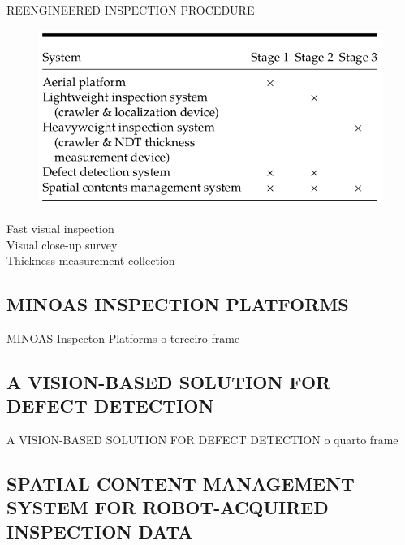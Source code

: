 \documentclass{beamer}
\begin{document}
            \begin{frame}{REENGINEERED INSPECTION PROCEDURE}
                \begin{figure}[htb]
                    \centering
                    \includegraphics[scale=0.35]{figuras/inspection_stages}                   
                    \label{}
                \end{figure}
                Fast visual inspection \\
                Visual close-up survey \\
                Thickness measurement collection
            \end{frame}

        \subsection{MINOAS INSPECTION PLATFORMS}

            \begin{frame}{MINOAS Inspecton Platforms}
                o terceiro frame            
            \end{frame}

        \subsection{A VISION-BASED SOLUTION FOR DEFECT DETECTION}

            \begin{frame}{A VISION-BASED SOLUTION FOR DEFECT DETECTION}
                o quarto frame            
            \end{frame}            

        \subsection{SPATIAL CONTENT MANAGEMENT SYSTEM FOR ROBOT-ACQUIRED INSPECTION DATA}
\end{document}
